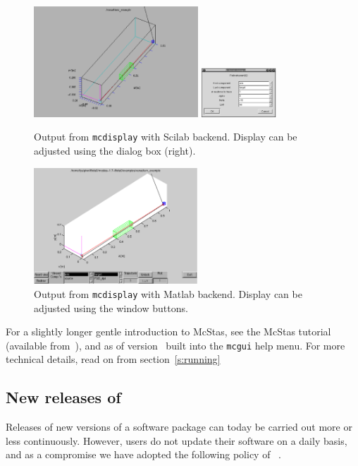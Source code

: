 \begin{figure}[htb!]
  \begin{center}
    \includegraphics[width=0.55\textwidth]{figures/mcdisplay_Scilab.ps}
    \includegraphics[width=0.25\textwidth]{figures/mcdisplay_Scilab_dialog.ps}
  \end{center}
\caption{Output from \texttt{mcdisplay} with Scilab backend. Display
  can be adjusted using the dialog box (right).}
\label{fig:mcdisp_Scilab}
\end{figure}
\begin{figure}[htb!]
  \begin{center}
    \includegraphics[width=0.55\textwidth]{figures/mcdisplay_Matlab.eps}
  \end{center}
  \caption{Output from \texttt{mcdisplay} with Matlab backend. Display can be
    adjusted using the window buttons.}
\label{fig:mcdisp_Matlab}
\end{figure}

For a slightly longer gentle introduction to McStas, see the McStas tutorial
(available from~\cite{mcstas_webpage}), and as of version \version\ built into
the \verb+mcgui+ help menu. For more technical details, read on from
section~\ref{s:running}

\subsection{New releases of \MCS}
Releases of new versions of a software package can today be carried out more or
less continuously. However, users do not update their software on a daily basis,
and as a compromise we have adopted the following policy of \MCS\ .

